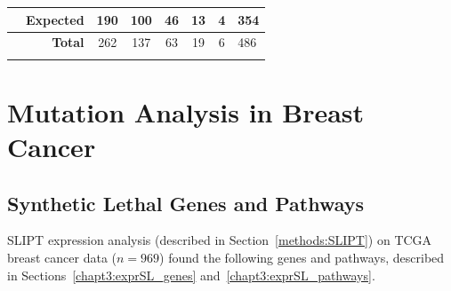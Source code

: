 \begin{table}[!ht]
\begin{center}
\begin{tabular}{>{\cellcolor{white}}rrcccccl}
\rowcolor{black!10}
\multicolumn{1}{r|}{\cellcolor{white}\multirow{-2}{*}{\bfseries SLIPT$-$}}  & \multicolumn{1}{r|}{Expected}                             & 190                      & 100                      & 46                      & 13                      & \multicolumn{1}{c|}{4}   & \multicolumn{1}{l|}{\multirow{-2}{*}{354}} \\ \cline{2-8} 
\rowcolor{black!5}
\cellcolor{white}                                                           & \multicolumn{1}{r|}{\cellcolor{white} \bfseries Total}    & \multicolumn{1}{c}{262} & \multicolumn{1}{c}{137} & \multicolumn{1}{c}{63} & \multicolumn{1}{c}{19} & \multicolumn{1}{c|}{6}   & \multicolumn{1}{l|}{486}                  \\ \cline{3-8} 
\end{tabular} 
\end{center}
\end{table}
\fi

\chapter{Mutation Analysis in Breast Cancer}
\label{appendix:mtSL}

\section{Synthetic Lethal Genes and Pathways} \label{appendix:mtSL_genes}

SLIPT expression analysis (described in Section~\ref{methods:SLIPT}) on \gls{TCGA} breast cancer data ($n = 969$) found the following genes and pathways, described in Sections~\ref{chapt3:exprSL_genes} and~\ref{chapt3:exprSL_pathways}.





